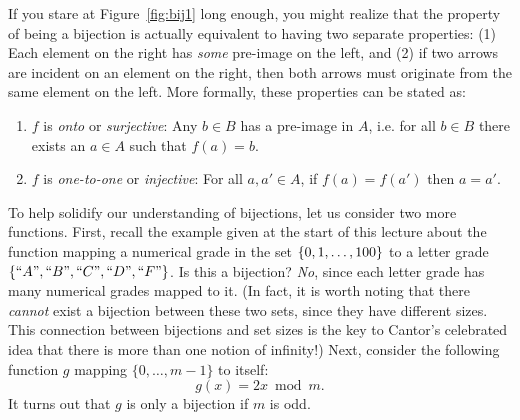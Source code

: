 \documentclass[11pt]{article}
\begin{document}
\pagebreak


If you stare at Figure~\ref{fig:bij1} long enough, you might realize that the property of being a bijection is actually equivalent to having two separate properties: (1) Each element on the right has \emph{some} pre-image on the left, and (2) if two arrows are incident on an element on the right, then both arrows must originate from the same element on the left. More formally, these properties can be stated as:
\begin{enumerate}
\item $f$ is {\em onto} or \emph{surjective}: Any $b \in B$ has a pre-image in $A$, i.e. for all $b\in B$ there exists an $a\in A$ such that $f(a)=b$.
\item $f$ is {\em one-to-one} or \emph{injective}: For all $a,a'\in A$, if $f(a) = f(a')$ then $a = a'$.
\end{enumerate}

To help solidify our understanding of bijections, let us consider two more functions. First, recall the example given at the start of this lecture about the function mapping a numerical grade in the set ${\left\{0,1,\ldots,100\right\}}$ to a letter grade ${\left\{``A", ``B", ``C", ``D", ``F"\right\}}$. Is this a bijection?
\emph{No}, since each letter grade has many numerical grades mapped to it. (In fact, it is worth noting that there \emph{cannot} exist a bijection between these two sets, since they have different sizes. This connection between bijections and set sizes is the key to Cantor's celebrated idea that there is more than one notion of infinity!) Next, consider the following function $g$ mapping $\{0,\dots,m-1\}$ to itself:
\begin{equation}\label{eqn:1}
g(x) = 2x \bmod m.
\end{equation}
It turns out that $g$ is only a bijection if $m$ is odd.

\end{document}
